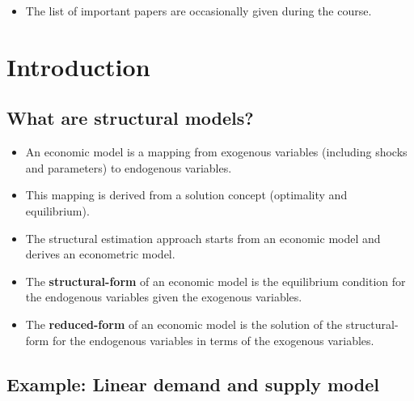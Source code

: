 \documentclass[
]{book}
\providecommand{\tightlist}{%
  \setlength{\itemsep}{0pt}\setlength{\parskip}{0pt}}
\begin{document}
\begin{itemize}
\tightlist
\item
  The list of important papers are occasionally given during the course.
\end{itemize}

\hypertarget{intro}{%
\chapter{Introduction}\label{intro}}

\hypertarget{what-are-structural-models}{%
\section{What are structural models?}\label{what-are-structural-models}}

\begin{itemize}
\tightlist
\item
  An economic model is a mapping from exogenous variables (including shocks and parameters) to endogenous variables.
\item
  This mapping is derived from a solution concept (optimality and equilibrium).
\item
  The structural estimation approach starts from an economic model and derives an econometric model.
\item
  The \textbf{structural-form} of an economic model is the equilibrium condition for the endogenous variables given the exogenous variables.
\item
  The \textbf{reduced-form} of an economic model is the solution of the structural-form for the endogenous variables in terms of the exogenous variables.
\end{itemize}

\hypertarget{example-linear-demand-and-supply-model}{%
\section{Example: Linear demand and supply model}\label{example-linear-demand-and-supply-model}}
\end{document}
